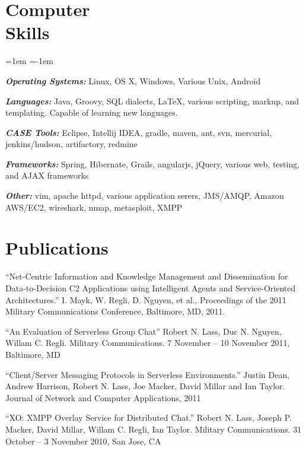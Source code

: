\documentclass[margin]{res}
\begin{document}
\begin{resume}
\section{Computer \\ Skills}
\begin{list}{}%
{\leftmargin=1em \itemindent=-1em}
  \item \textbf{\textit{Operating Systems:}} Linux, OS X, Windows, Various Unix, Android
  \item \textbf{\textit{Languages:}} Java, Groovy, SQL dialects, \LaTeX, various scripting, markup, and templating. Capable of learning new languages.
  \item \textbf{\textit{CASE Tools: }} Eclipse, Intellij IDEA, gradle, maven, ant, svn, mercurial, jenkins/hudson, artifactory, redmine
  \item \textbf{\textit{Frameworks: }} Spring, Hibernate, Grails, angularjs, jQuery, various web, testing, and AJAX frameworks
  \item \textbf{\textit{Other: }} vim, apache httpd, various application serers, JMS/AMQP, Amazon AWS/EC2, wireshark, nmap, metasploit, XMPP
\end{list}




\section{Publications}
  ``Net-Centric Information and Knowledge Management and Dissemination for Data-to-Decision C2 Applications using Intelligent Agents and Service-Oriented Architectures.'' I. Mayk, W. Regli, D. Nguyen, et al.,  Proceedings of the 2011 Military Communications Conference, Baltimore, MD, 2011. 

  ``An Evaluation of Serverless Group Chat'' Robert N. Lass, Duc N. Nguyen,  Willam C. Regli. Military Communications. 7 November -- 10 November 2011, Baltimore, MD

  ``Client/Server Messaging Protocols in Serverless Environments.'' Justin Dean, Andrew Harrison, Robert N. Lass, Joe Macker, David Millar and Ian Taylor. Journal of Network and Computer Applications, 2011

  ``XO: XMPP Overlay Service for Distributed Chat.'' Robert N. Lass, Joseph P. Macker, David Millar, Willam C. Regli, Ian Taylor. Military Communications. 31 October -- 3 November 2010, San Jose, CA


\end{resume}
\end{document}
